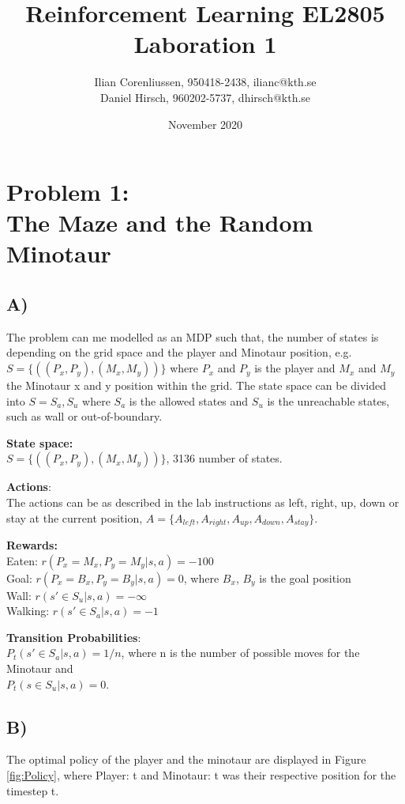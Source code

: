 \documentclass{article}
\title{Reinforcement Learning EL2805\\
       Laboration 1}
\author{Ilian Corenliussen, 950418-2438, ilianc@kth.se\\ 
        Daniel Hirsch, 960202-5737, dhirsch@kth.se}
\date{November 2020}
\begin{document}
\maketitle

\section*{Problem 1: \\
        The Maze and the Random Minotaur}
\subsection*{A)}
The problem can me modelled as an MDP such that, the number of states is depending on the grid space and the player and Minotaur position, e.g. $S = \{((P_x, P_y),(M_x, M_y) )\} $ where $P_x$ and $P_y$ is the player and $M_x$ and $M_y$ the Minotaur x and y position within the grid. The state space can be divided into $S = {S_a, S_u}$ where $S_a$ is the allowed states and $S_u$ is the unreachable states, such as wall or out-of-boundary.


\textbf{State space:}\\
$S = \{((P_x, P_y),(M_x, M_y) )\} $, 3136 number of states. 

\textbf{Actions}: \\
The actions can be as described in the lab instructions as left, right, up, down or stay at the current position, $A = \{ A_{left}, A_{right}, A_{up}, A_{down}, A_{stay} \}$. 

\textbf{Rewards:} \\
Eaten: $r(P_x = M_x , P_y = M_y |s,a) = -100 $\\ 
Goal: $r(P_x = B_x , P_y = B_y |s,a) = 0 $, where $B_x$, $B_y$ is the goal position\\
Wall: $r(s'\in S_u |s,a) = -\infty $\\
Walking: $r(s'\in S_a |s,a) = -1 $

\textbf{Transition Probabilities}:\\
$P_t(s' \in S_a |s,a) = 1/n$, where n is the number of possible moves for the Minotaur and \\$P_t(s \in S_u |s,a) = 0$. 

\subsection*{B)}
The optimal policy of the player and the minotaur are displayed in Figure \ref{fig:Policy}, where Player: t and Minotaur: t was their respective position for the timestep t. 
\end{document}
